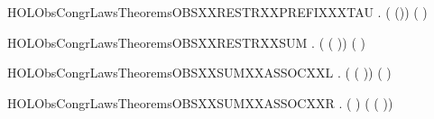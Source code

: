 \newcommand{\HOLObsCongrLawsTheoremsOBSXXRESTRXXPREFIXXXLABEL}{\UseVerbatim{HOLObsCongrLawsTheoremsOBSXXRESTRXXPREFIXXXLABEL}}
\begin{SaveVerbatim}{HOLObsCongrLawsTheoremsOBSXXRESTRXXPREFIXXXTAU}
\HOLTokenTurnstile{} \HOLSymConst{\HOLTokenForall{}} .  (\HOLConst{\ensuremath{\nu}}  (\HOLConst{\ensuremath{\tau}})) (\HOLConst{\ensuremath{\tau}}\HOLConst{\ensuremath{\nu}}  )
\end{SaveVerbatim}
\newcommand{\HOLObsCongrLawsTheoremsOBSXXRESTRXXPREFIXXXTAU}{\UseVerbatim{HOLObsCongrLawsTheoremsOBSXXRESTRXXPREFIXXXTAU}}
\begin{SaveVerbatim}{HOLObsCongrLawsTheoremsOBSXXRESTRXXSUM}
\HOLTokenTurnstile{} \HOLSymConst{\HOLTokenForall{}}  .  (\HOLConst{\ensuremath{\nu}}  ( \HOLSymConst{+} )) (\HOLConst{\ensuremath{\nu}}   \HOLSymConst{+} \HOLConst{\ensuremath{\nu}}  )
\end{SaveVerbatim}
\newcommand{\HOLObsCongrLawsTheoremsOBSXXRESTRXXSUM}{\UseVerbatim{HOLObsCongrLawsTheoremsOBSXXRESTRXXSUM}}
\begin{SaveVerbatim}{HOLObsCongrLawsTheoremsOBSXXSUMXXASSOCXXL}
\HOLTokenTurnstile{} \HOLSymConst{\HOLTokenForall{}}  .  ( \HOLSymConst{+} ( \HOLSymConst{+} )) ( \HOLSymConst{+}  \HOLSymConst{+} )
\end{SaveVerbatim}
\newcommand{\HOLObsCongrLawsTheoremsOBSXXSUMXXASSOCXXL}{\UseVerbatim{HOLObsCongrLawsTheoremsOBSXXSUMXXASSOCXXL}}
\begin{SaveVerbatim}{HOLObsCongrLawsTheoremsOBSXXSUMXXASSOCXXR}
\HOLTokenTurnstile{} \HOLSymConst{\HOLTokenForall{}}  .  ( \HOLSymConst{+}  \HOLSymConst{+} ) ( \HOLSymConst{+} ( \HOLSymConst{+} ))
\end{SaveVerbatim}
\newcommand{\HOLObsCongrLawsTheoremsOBSXXSUMXXASSOCXXR}{\UseVerbatim{HOLObsCongrLawsTheoremsOBSXXSUMXXASSOCXXR}}
